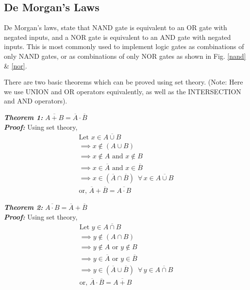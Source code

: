 
\subsection*{De Morgan's Laws}

De Morgan's laws, state that NAND gate is equivalent to an OR gate with negated inputs, and a NOR gate is equivalent to an AND gate with negated inputs. This is most commonly used to implement logic gates as combinations of only NAND gates, or as combinations of only NOR gates as shown in Fig. \ref{nand} \& \ref{nor}.

There are two basic theorems which can be proved using set theory. (Note: Here we use UNION and OR operators equivalently, as well as the INTERSECTION and AND operators).
\newpage

\noindent \textit{\textbf{Theorem 1: }}${\overline{A+B} = \overline{A} \cdot \overline {B}}$\\
\textit{\textbf{Proof: }} Using set theory,
\begin{gather*}
    \text{Let } x \in \overline{A \cup B}\\
    \implies x \notin (A \cup B) \\
    \implies x \notin A \text{ and } x \notin B\\
    \implies x \in \overline{A} \text{ and } x \in \overline{B}\\
    \implies x \in (\overline{A} \cap \overline{B})\,\,\,\forall\,x \in \overline{A \cup B}\\
    \text{or, }\overline{A} + \overline {B} = \overline{A \cdot B}
\end{gather*}

\noindent \textit{\textbf{Theorem 2: }}${\overline{A\cdot B} = \overline{A} + \overline {B}}$\\
\textit{\textbf{Proof: }} Using set theory,
\begin{gather*}
    \text{Let } y \in \overline{A \cap B}\\
    \implies y \notin (A \cap B) \\
    \implies y \notin A \text{ or } y \notin B \\
    \implies y \in \overline{A} \text{ or } y \in \overline{B}\\
    \implies y \in (\overline{A} \cup \overline{B})\,\,\,\forall\,y \in \overline{A \cap B}\\
    \text{or, }\overline{A} \cdot \overline {B} = \overline{A + B}
\end{gather*}

